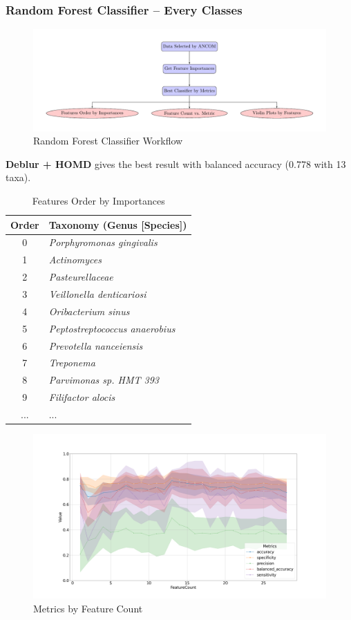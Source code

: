 \documentclass{beamer}
\begin{document}
    \begin{frame}[allowframebreaks]
        \frametitle{Random Forest Classifier -- Every Classes}

        \begin{figure}
            \includegraphics[width=0.8 \linewidth]{figures/RandomForest/whole.pdf}
            \caption{Random Forest Classifier Workflow}
        \end{figure}

        \textbf{Deblur + HOMD} gives the best result with balanced accuracy (0.778 with 13 taxa).

        \begin{table}
            \caption{Features Order by Importances}
            \begin{tabular}{c|l}
                Order & Taxonomy (Genus [Species]) \\ \hline
                0 & \textit{Porphyromonas gingivalis} \\
                1 & \textit{Actinomyces} \\
                2 & \textit{Pasteurellaceae} \\
                3 & \textit{Veillonella denticariosi} \\
                4 & \textit{Oribacterium sinus} \\
                5 & \textit{Peptostreptococcus anaerobius} \\
                6 & \textit{Prevotella nanceiensis} \\
                7 & \textit{Treponema} \\
                8 & \textit{Parvimonas sp. HMT 393} \\
                9 & \textit{Filifactor alocis} \\
                ... & ... \\
            \end{tabular}
        \end{table}

        \begin{figure}
            \includegraphics[width=0.8 \linewidth]{figures/RandomForest/ANCOM.Deblur.homd/metrics.png}
            \caption{Metrics by Feature Count}
        \end{figure}


\end{frame}
\end{document}
